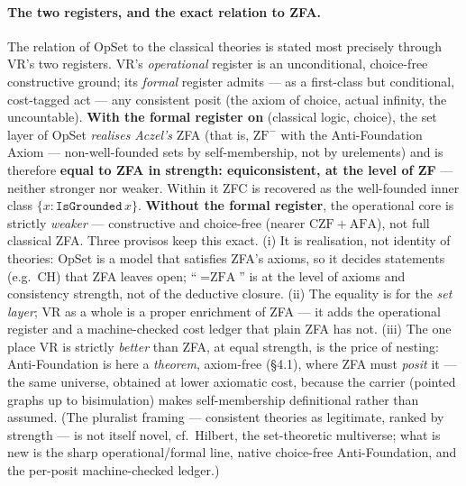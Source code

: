 \documentclass[11pt]{article}
\theoremstyle{remark}
\newcommand{\OpSet}{\textsf{OpSet}}
\begin{document}
\paragraph{The two registers, and the exact relation to ZFA.} The relation of \OpSet{} to the
classical theories is stated most precisely through VR's two registers. VR's \emph{operational}
register is an unconditional, choice-free constructive ground; its \emph{formal} register admits --- as
a first-class but conditional, cost-tagged act --- any consistent posit (the axiom of choice, actual
infinity, the uncountable). \textbf{With the formal register on} (classical logic, choice), the set
layer of \OpSet{} \emph{realises} \emph{Aczel's} ZFA (that is, $\mathrm{ZF}^-$ with the
Anti-Foundation Axiom --- non-well-founded sets by self-membership, not by urelements) and is
therefore \textbf{equal to ZFA in strength: equiconsistent, at the level of ZF} --- neither stronger
nor weaker. Within it ZFC is recovered as the well-founded inner class $\{x : \texttt{IsGrounded}\,x\}$.
\textbf{Without the formal register}, the operational core is strictly \emph{weaker} --- constructive
and choice-free (nearer $\mathrm{CZF}+\mathrm{AFA}$), not full classical ZFA. Three provisos keep this
exact. (i) It is realisation, not identity of theories: \OpSet{} is a model that satisfies ZFA's
axioms, so it decides statements (e.g.\ CH) that ZFA leaves open; ``$=\text{ZFA}$'' is at the level of
axioms and consistency strength, not of the deductive closure. (ii) The equality is for the
\emph{set layer}; VR as a whole is a proper enrichment of ZFA --- it adds the operational register and
a machine-checked cost ledger that plain ZFA has not. (iii) The one place VR is strictly \emph{better}
than ZFA, at equal strength, is the price of nesting: Anti-Foundation is here a \emph{theorem},
axiom-free (\S4.1), where ZFA must \emph{posit} it --- the same universe, obtained at lower axiomatic
cost, because the carrier (pointed graphs up to bisimulation) makes self-membership definitional rather
than assumed. (The pluralist framing --- consistent theories as legitimate, ranked by strength --- is
not itself novel, cf.\ Hilbert, the set-theoretic multiverse; what is new is the sharp
operational/formal line, native choice-free Anti-Foundation, and the per-posit machine-checked ledger.)
\end{document}
